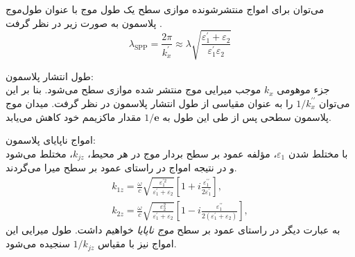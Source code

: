می‌توان برای امواج منتشر‌شونده موازی سطح یک طول موج با عنوان طول‌موج پلاسمون به صورت زیر در نظر گرفت .
\begin{equation}\label{eq:17}
\lambda_\text{SPP}=\frac{2\pi}{k_x^\prime}\approx\lambda\sqrt{\frac{\varepsilon_1^\prime+\varepsilon_2}{\varepsilon_1^\prime\varepsilon_2}}
\end{equation}

طول انتشار پلاسمون:\\
جزء موهومی $k_x$ موجب میرایی موج منتشر شده موازی سطح می‌شود. بنا بر این می‌توان $1/k_x^{\prime\prime}$ را به عنوان مقیاسی از طول انتشار پلاسمون در نظر گرفت. میدان موج پلاسمون سطحی پس از طی این طول به $1/\mathbf{e}$ مقدار ماکزیمم خود کاهش می‌یابد.

امواج ناپایای پلاسمون:\\
با مختلط شدن $\varepsilon_1$، مؤلفه عمود بر سطح بردار موج در هر محیط، $k_{jz}$، مختلط می‌شود و در نتیجه امواج در راستای عمود بر سطح میرا می‌گردند.
\begin{eqnarray}
k_{1z}=\frac{\omega}{c}\sqrt{\frac{\varepsilon_1^{\prime 2}}{\varepsilon_1^\prime+\varepsilon_2}}\left[1+i\frac{\varepsilon_1^{\prime\prime}}{2\varepsilon_1^\prime}\right],\label{eq:18}\\
k_{2z}=\frac{\omega}{c}\sqrt{\frac{\varepsilon_2^2}{\varepsilon_1^\prime+\varepsilon_2}}\left[1-i\frac{\varepsilon_1^{\prime\prime}}{2\left(\varepsilon_1^\prime+\varepsilon_2\right)}\right],\label{eq:19}
\end{eqnarray}
به عبارت دیگر در راستای عمود بر سطح \emph{موج ناپایا} خواهیم داشت. طول میرایی این امواج نیز با مقیاس $1/k_{jz}$ سنجیده می‌شود.


